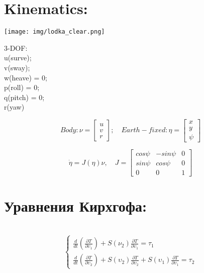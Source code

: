 \newpage

\section*{Kinematics:}

\begin{center}
\texttt{[image: img/lodka\_clear.png]}\\
\end{center} 

3-DOF: \\

u(surve); \\

v(sway); \\

w(heave) = 0; \\

p(roll) = 0; \\

q(pitch) = 0; \\

r(yaw) \\



\begin{center}
\begin{equation*}

Body: \nu = \begin{bmatrix}
u \\
v \\
r
\end{bmatrix};\quad Earth-fixed: \eta = \begin{bmatrix}
 x \\
 y \\
 \psi
 \end{bmatrix} 
\end{equation*} 
\end{center}
\begin{equation*}
\Dot{\eta} = J(\eta)\nu, \quad J = \begin{bmatrix}
cos\psi & -sin\psi & 0 \\
sin\psi & cos\psi & 0 \\
0 & 0 & 1
 \end{bmatrix} 
\end{equation*}


\newpage
\section*{Уравнения Кирхгофа:}\\
\large
\begin{equation*}
 \begin{cases}
   \frac{d}{dt}(\frac{\partial T}{\partial \upsilon_1}) + S(\nu_2)\frac{\partial T}{\partial \upsilon_1} = \tau_1\\
   \frac{d}{dt}(\frac{\partial T}{\partial \upsilon_2}) + S(\upsilon_2)\frac{\partial T}{\partial \upsilon_2} + S(\upsilon_1)\frac{\partial T}{\partial \upsilon_1} = \tau_2
 \end{cases}
 \end{equation*}
 
